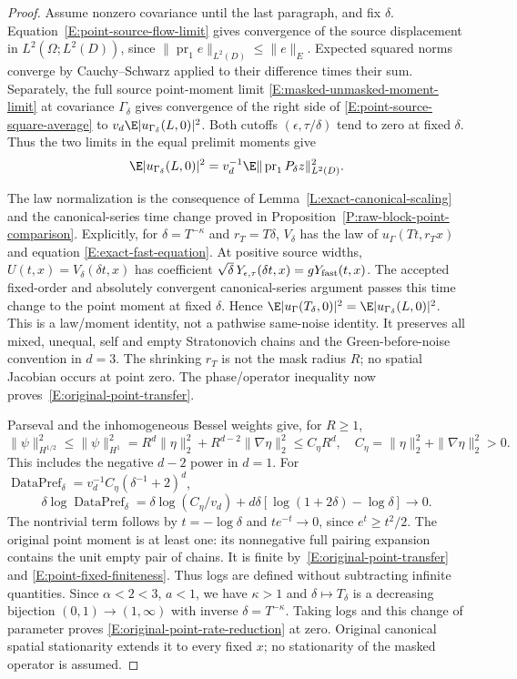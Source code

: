 \begin{proof}
  Assume nonzero covariance until the last paragraph, and fix $\delta$.
  Equation~\eqref{E:point-source-flow-limit} gives
  convergence of the source displacement in $L^2(\Omega;L^2(D))$,
  since $\|\operatorname{pr}_1e\|_{L^2(D)}\le\|e\|_E$.
  Expected squared norms converge by Cauchy--Schwarz applied to their
  difference times their sum.
  Separately, the full source point-moment limit
  \eqref{E:masked-unmasked-moment-limit} at covariance $\Gamma_\delta$
  gives convergence of the right side of
  \eqref{E:point-source-square-average} to
  $v_d\E|u_{\Gamma_\delta}(L,0)|^2$.
  Both cutoffs $(\epsilon,\tau/\delta)$ tend to zero at fixed $\delta$.
  Thus the two limits in the equal prelimit moments give
  \[
    \E|u_{\Gamma_\delta}(L,0)|^2
    =v_d^{-1}\E\|\operatorname{pr}_1P_\delta z\|_{L^2(D)}^2 .
  \]

  The law normalization is the consequence of
  Lemma~\ref{L:exact-canonical-scaling} and the canonical-series
  time change proved in Proposition~\ref{P:raw-block-point-comparison}.
  Explicitly, for $\delta=T^{-\kappa}$ and $r_T=T\delta$,
  $V_\delta$ has the law of $u_\Gamma(Tt,r_Tx)$ and equation
  \eqref{E:exact-fast-equation}.
  At positive source widths, $U(t,x)=V_\delta(\delta t,x)$ has
  coefficient $\sqrt\delta\,Y_{\epsilon,\tau}(\delta t,x)
  =gY_{\rm fast}(t,x)$.
  The accepted fixed-order and absolutely convergent canonical-series
  argument passes this time change to the point moment at fixed $\delta$.
  Hence $\E|u_\Gamma(T_\delta,0)|^2=\E|u_{\Gamma_\delta}(L,0)|^2$.
  This is a law/moment identity, not a pathwise same-noise identity.
  It preserves all mixed, unequal, self and empty Stratonovich chains
  and the Green-before-noise convention in $d=3$.
  The shrinking $r_T$ is not the mask radius $R$;
  no spatial Jacobian occurs at point zero.
  The phase/operator inequality now proves~\eqref{E:original-point-transfer}.

  Parseval and the inhomogeneous Bessel weights give, for $R\ge1$,
  \[
    \|\psi\|_{H^{1/2}}^2\le\|\psi\|_{H^1}^2
    =R^d\|\eta\|_2^2+R^{d-2}\|\nabla\eta\|_2^2
    \le C_\eta R^d,\quad C_\eta=\|\eta\|_2^2+\|\nabla\eta\|_2^2>0.
  \]
  This includes the negative $d-2$ power in $d=1$.
  For $\operatorname{DataPref}_\delta=v_d^{-1}C_\eta(\delta^{-1}+2)^d$,
  \[
    \delta\log\operatorname{DataPref}_\delta
    =\delta\log(C_\eta/v_d)+d\delta[\log(1+2\delta)-\log\delta]\to0 .
  \]
  The nontrivial term follows by $t=-\log\delta$ and
  $te^{-t}\to0$, since $e^t\ge t^2/2$.
  The original point moment is at least one: its nonnegative full
  pairing expansion contains the unit empty pair of chains.
  It is finite by~\eqref{E:original-point-transfer} and
  \eqref{E:point-fixed-finiteness}.
  Thus logs are defined without subtracting infinite quantities.
  Since $\alpha<2<3$, $a<1$, we have $\kappa>1$ and
  $\delta\mapsto T_\delta$ is a decreasing bijection
  $(0,1)\to(1,\infty)$ with inverse $\delta=T^{-\kappa}$.
  Taking logs and this change of parameter proves
  \eqref{E:original-point-rate-reduction} at zero.
  Original canonical spatial stationarity extends it to every fixed $x$;
  no stationarity of the masked operator is assumed.


\end{proof}
